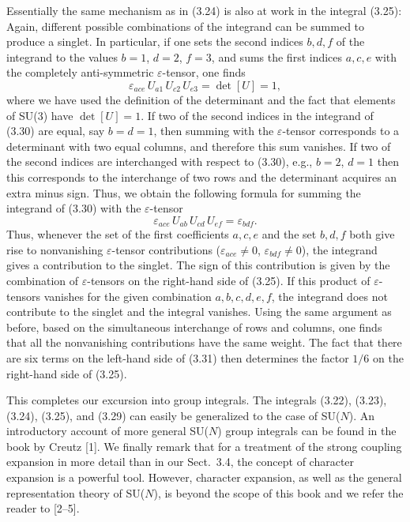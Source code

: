 Essentially the same mechanism as in (3.24) is also at work in the integral
(3.25): Again, different possible combinations of the integrand can be summed
to produce a singlet. In particular, if one sets the second indices $b, d, f$
of the integrand to the values $b = 1$, $d = 2$, $f = 3$, and sums the first
indices $a, c, e$ with the completely anti-symmetric $\varepsilon$-tensor, one
finds
\begin{equation}
  \varepsilon_{ace}\, U_{a1}\, U_{c2}\, U_{e3} = \det[U] = 1 ,
\end{equation}
where we have used the definition of the determinant and the fact that elements
of SU(3) have $\det[U] = 1$. If two of the second indices in the integrand of
(3.30) are equal, say $b = d = 1$, then summing with the $\varepsilon$-tensor
corresponds to a determinant with two equal columns, and therefore this sum
vanishes. If two of the second indices are interchanged with respect to (3.30),
e.g., $b = 2$, $d = 1$ then this corresponds to the interchange of two rows and
the determinant acquires an extra minus sign. Thus, we obtain the following
formula for summing the integrand of (3.30) with the $\varepsilon$-tensor
\begin{equation}
  \varepsilon_{ace}\, U_{ab}\, U_{cd}\, U_{ef} = \varepsilon_{bdf} .
\end{equation}
Thus, whenever the set of the first coefficients $a, c, e$ and the set $b, d,
f$ both give rise to nonvanishing $\varepsilon$-tensor contributions
($\varepsilon_{ace} \neq 0$, $\varepsilon_{bdf} \neq 0$), the integrand gives a
contribution to the singlet. The sign of this contribution is given by the
combination of $\varepsilon$-tensors on the right-hand side of (3.25). If this
product of $\varepsilon$-tensors vanishes for the given combination $a, b, c,
d, e, f$, the integrand does not contribute to the singlet and the integral
vanishes. Using the same argument as before, based on the simultaneous
interchange of rows and columns, one finds that all the nonvanishing
contributions have the same weight. The fact that there are six terms on the
left-hand side of (3.31) then determines the factor $1/6$ on the right-hand
side of (3.25).

This completes our excursion into group integrals. The integrals (3.22),
(3.23), (3.24), (3.25), and (3.29) can easily be generalized to the case of
SU($N$). An introductory account of more general SU($N$) group integrals can be
found in the book by Creutz [1]. We finally remark that for a treatment of the
strong coupling expansion in more detail than in our Sect.~3.4, the concept of
character expansion is a powerful tool. However, character expansion, as well
as the general representation theory of SU($N$), is beyond the scope of this
book and we refer the reader to [2--5].

